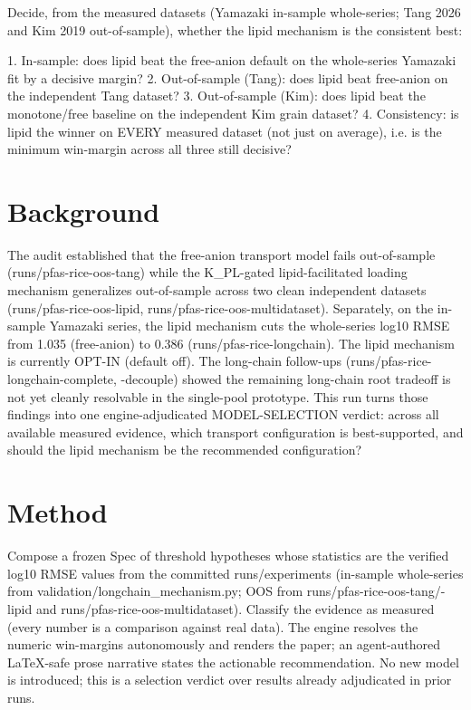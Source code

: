 \documentclass{article}
\begin{document}
Decide, from the measured datasets (Yamazaki in-sample whole-series; Tang 2026 and
Kim 2019 out-of-sample), whether the lipid mechanism is the consistent best:

1. In-sample: does lipid beat the free-anion default on the whole-series Yamazaki
   fit by a decisive margin?
2. Out-of-sample (Tang): does lipid beat free-anion on the independent Tang dataset?
3. Out-of-sample (Kim): does lipid beat the monotone/free baseline on the
   independent Kim grain dataset?
4. Consistency: is lipid the winner on EVERY measured dataset (not just on average),
   i.e. is the minimum win-margin across all three still decisive?

\section{Background}
The audit established that the free-anion transport model fails out-of-sample
(runs/pfas-rice-oos-tang) while the K\_PL-gated lipid-facilitated loading mechanism
generalizes out-of-sample across two clean independent datasets
(runs/pfas-rice-oos-lipid, runs/pfas-rice-oos-multidataset). Separately, on the
in-sample Yamazaki series, the lipid mechanism cuts the whole-series log10 RMSE
from 1.035 (free-anion) to 0.386 (runs/pfas-rice-longchain). The lipid mechanism
is currently OPT-IN (default off). The long-chain follow-ups
(runs/pfas-rice-longchain-complete, -decouple) showed the remaining long-chain
root tradeoff is not yet cleanly resolvable in the single-pool prototype. This run
turns those findings into one engine-adjudicated MODEL-SELECTION verdict: across
all available measured evidence, which transport configuration is best-supported,
and should the lipid mechanism be the recommended configuration?

\section{Method}
Compose a frozen Spec of threshold hypotheses whose statistics are the verified
log10 RMSE values from the committed runs/experiments (in-sample whole-series from
validation/longchain\_mechanism.py; OOS from runs/pfas-rice-oos-tang/-lipid and
runs/pfas-rice-oos-multidataset). Classify the evidence as measured (every number
is a comparison against real data). The engine resolves the numeric win-margins
autonomously and renders the paper; an agent-authored LaTeX-safe prose narrative
states the actionable recommendation. No new model is introduced; this is a
selection verdict over results already adjudicated in prior runs.
\end{document}
